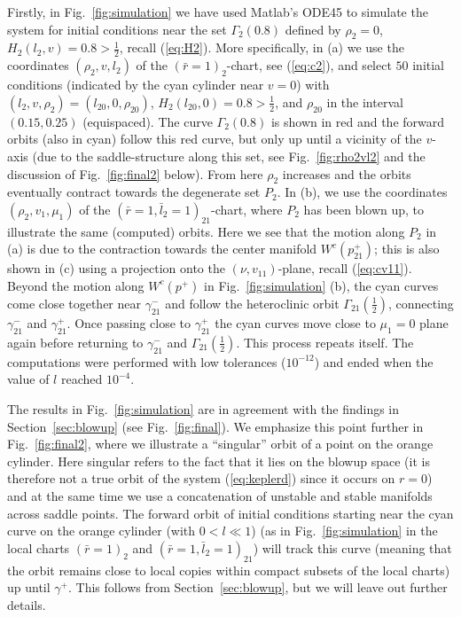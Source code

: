 \documentclass[reqno,12pt]{amsart}
\newcommand{\secref}[1]{Section~\ref{sec:#1}}
\renewcommand{\eqref}[1]{(\ref{eq:#1})}
\newcommand{\figref}[1]{Fig.~\ref{fig:#1}}
\numberwithin{equation}{section}
\begin{document}
Firstly, in \figref{simulation} we have used Matlab's ODE45 to simulate the system for initial conditions near the set $\Gamma_2(0.8)$ defined by $\rho_2=0$, $H_2(l_2,v)= 0.8>\frac12$, recall \eqref{H2}. More specifically, in (a) we use the coordinates $(\rho_2,v,l_2)$ of the $(\bar r=1)_2$-chart, see \eqref{c2}, and select $50$ initial conditions (indicated by the cyan cylinder near $v=0$) with $(l_2,v,\rho_2)=(l_{20},0,\rho_{20})$, $H_2(l_{20},0)=0.8>\frac12$, and $\rho_{20}$ in the interval $(0.15,0.25)$ (equispaced). The curve $\Gamma_2(0.8)$ is shown in red and the forward orbits (also in cyan) follow this red curve, but only up until a vicinity  of the $v$-axis (due to the saddle-structure along this set, see \figref{rho2vl2} and the discussion of \figref{final2} below). From here $\rho_2$ increases and the orbits eventually contract towards the degenerate set $P_2$. In (b), we use the coordinates $(\rho_2,v_1,\mu_1)$ of the $(\bar r=1,\bar l_2=1)_{21}$-chart, where $P_2$ has been blown up, to illustrate the same (computed) orbits. Here we see that the motion along $P_2$ in (a) is due to the contraction towards the center manifold $W^c(p_{21}^+)$; this is also shown in (c) using a projection onto the $(\nu,v_{11})$-plane, recall \eqref{cv11}. Beyond the motion along $W^c(p^+)$ in \figref{simulation} (b), the cyan curves come close together near $\gamma_{21}^-$ and follow the heteroclinic orbit $\Gamma_{21}\!\left(\frac12\right)$, connecting $\gamma_{21}^-$ and $\gamma_{21}^+$. Once passing close to $\gamma_{21}^+$ the cyan curves move close to $\mu_1=0$ plane again before returning to $\gamma_{21}^-$ and $\Gamma_{21}\!\left(\frac12\right)$. This process repeats itself. 
The computations were performed with low tolerances ($10^{-12}$) and ended when the value of $l$ reached $10^{-4}$. %






The results in \figref{simulation} are in agreement with the findings in \secref{blowup} (see \figref{final}). We emphasize this point further in \figref{final2}, where we illustrate a ``singular'' orbit of a point on the orange cylinder. Here singular refers to the fact that it lies on the blowup space (it is therefore not a true orbit of the system \eqref{keplerd} since it occurs on $r=0$) and at the same time we use a concatenation of unstable and stable manifolds across saddle points. The forward orbit of initial conditions starting near the cyan curve on the orange cylinder (with $0<l\ll 1$) (as in \figref{simulation} in the local charts $(\bar r=1)_2$ and $(\bar r=1,\bar l_2=1)_{21}$) will track this curve (meaning that the orbit remains close to local copies within compact subsets of the local charts) up until $\gamma^+$. This follows from \secref{blowup}, but we will leave out further details. 
\end{document}
